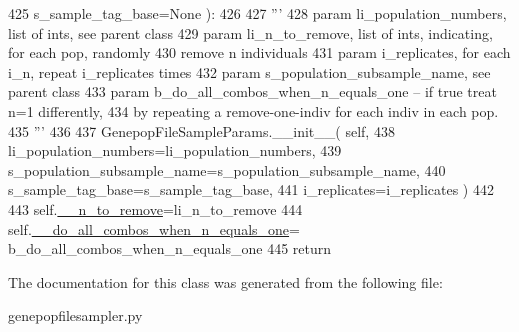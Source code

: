 \begin{DoxyCode}
425             s\_sample\_tag\_base=\textcolor{keywordtype}{None} ):
426 
427         \textcolor{stringliteral}{'''}
428 \textcolor{stringliteral}{        param li\_population\_numbers, list of ints, see parent class}
429 \textcolor{stringliteral}{        param li\_n\_to\_remove, list of ints, indicating, for each pop, randomly }
430 \textcolor{stringliteral}{              remove n individuals}
431 \textcolor{stringliteral}{        param i\_replicates, for each i\_n, repeat i\_replicates times}
432 \textcolor{stringliteral}{        param s\_population\_subsample\_name, see parent class}
433 \textcolor{stringliteral}{        param b\_do\_all\_combos\_when\_n\_equals\_one -- if true treat n=1 differently,}
434 \textcolor{stringliteral}{              by repeating a remove-one-indiv for each indiv in each pop.}
435 \textcolor{stringliteral}{        '''}
436 
437         GenepopFileSampleParams.\_\_init\_\_( self, 
438                     li\_population\_numbers=li\_population\_numbers, 
439                     s\_population\_subsample\_name=s\_population\_subsample\_name,
440                     s\_sample\_tag\_base=s\_sample\_tag\_base,
441                     i\_replicates=i\_replicates )
442 
443         self.\hyperlink{classnegui_1_1genepopfilesampler_1_1GenepopFileSampleParamsRemoval_a23d601163d8118b7af9acf6acf78eecf}{\_\_n\_to\_remove}=li\_n\_to\_remove
444         self.\hyperlink{classnegui_1_1genepopfilesampler_1_1GenepopFileSampleParamsRemoval_a24a47d9cdac499238a1368dcc626e8a3}{\_\_do\_all\_combos\_when\_n\_equals\_one}=
      b\_do\_all\_combos\_when\_n\_equals\_one
445         \textcolor{keywordflow}{return}
\end{DoxyCode}


The documentation for this class was generated from the following file\+:\begin{DoxyCompactItemize}
\item 
genepopfilesampler.\+py\end{DoxyCompactItemize}
